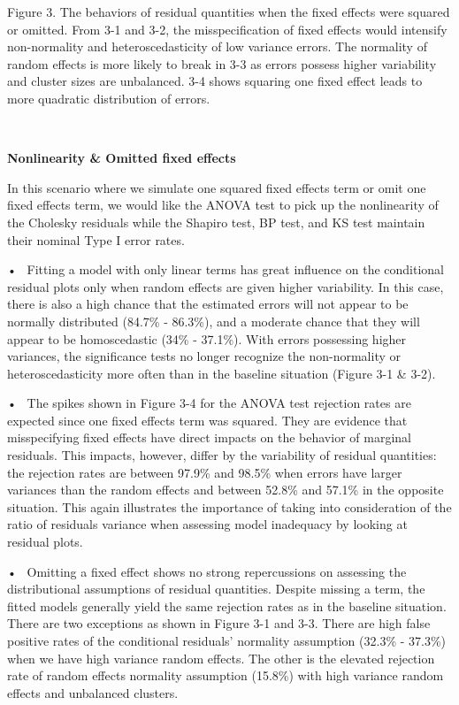 \documentclass[12pt]{article}
\begin{document}
\vspace{-7pt}

\begin{spacing}{0.5}
\begingroup
{}\fontsize{6.3}{16}\selectfont
Figure 3. The behaviors of residual quantities when the fixed effects were squared or omitted.
From 3-1 and 3-2, the misspecification of fixed effects would intensify non-normality and heteroscedasticity of low variance errors. The normality of random effects is more likely to break in 3-3 as errors possess higher variability and cluster sizes are unbalanced. 3-4 shows squaring one fixed effect leads to more quadratic distribution of errors. 
\endgroup
\end{spacing}

~

\textbf{Nonlinearity \& Omitted fixed effects}

In this scenario where we simulate one squared fixed effects term or
omit one fixed effects term, we would like the ANOVA test to pick up the
nonlinearity of the Cholesky residuals while the Shapiro test, BP test,
and KS test maintain their nominal Type I error rates.

• ~Fitting a model with only linear terms has great influence on the
conditional residual plots only when random effects are given higher
variability. In this case, there is also a high chance that the
estimated errors will not appear to be normally distributed (84.7\% -
86.3\%), and a moderate chance that they will appear to be homoscedastic
(34\% - 37.1\%). With errors possessing higher variances, the
significance tests no longer recognize the non-normality or
heteroscedasticity more often than in the baseline situation (Figure 3-1
\& 3-2).

• ~The spikes shown in Figure 3-4 for the ANOVA test rejection rates are
expected since one fixed effects term was squared. They are evidence
that misspecifying fixed effects have direct impacts on the behavior of
marginal residuals. This impacts, however, differ by the variability of
residual quantities: the rejection rates are between 97.9\% and 98.5\%
when errors have larger variances than the random effects and between
52.8\% and 57.1\% in the opposite situation. This again illustrates the
importance of taking into consideration of the ratio of residuals
variance when assessing model inadequacy by looking at residual plots.

• ~Omitting a fixed effect shows no strong repercussions on assessing
the distributional assumptions of residual quantities. Despite missing a
term, the fitted models generally yield the same rejection rates as in
the baseline situation. There are two exceptions as shown in Figure 3-1
and 3-3. There are high false positive rates of the conditional
residuals' normality assumption (32.3\% - 37.3\%) when we have high
variance random effects. The other is the elevated rejection rate of
random effects normality assumption (15.8\%) with high variance random
effects and unbalanced clusters.
\end{document}

